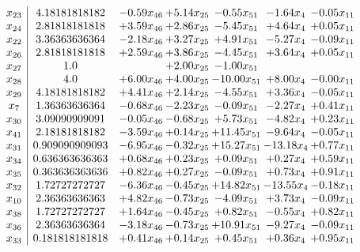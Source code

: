 \documentclass[8pt]{article}
\begin{document}
\[\begin{array}{c| c c@{\hskip 2pt} c@{\hskip 2pt} c@{\hskip 2pt} c@{\hskip 2pt} c@{\hskip 2pt} }
 x_{23}   &  4.18181818182 & -0.59 x_{46} & +  5.14 x_{25} & -0.55 x_{51} & -1.64 x_{4} & -0.05 x_{11}\\
 x_{24}   &  2.81818181818 & +  3.59 x_{46} & +  2.86 x_{25} & -5.45 x_{51} & +  4.64 x_{4} & +  0.05 x_{11}\\
 x_{22}   &  3.36363636364 & -2.18 x_{46} & +  3.27 x_{25} & +  4.91 x_{51} & -5.27 x_{4} & -0.09 x_{11}\\
 x_{26}   &  2.81818181818 & +  2.59 x_{46} & +  3.86 x_{25} & -4.45 x_{51} & +  3.64 x_{4} & +  0.05 x_{11}\\
 x_{27}   &  1.0  &   & +  2.00 x_{25} & -1.00 x_{51} &    &   \\
 x_{28}   &  4.0 & +  6.00 x_{46} & +  4.00 x_{25} & -10.00 x_{51} & +  8.00 x_{4} & -0.00 x_{11}\\
 x_{29}   &  4.18181818182 & +  4.41 x_{46} & +  2.14 x_{25} & -4.55 x_{51} & +  3.36 x_{4} & -0.05 x_{11}\\
 x_{7}   &  1.36363636364 & -0.68 x_{46} & -2.23 x_{25} & -0.09 x_{51} & -2.27 x_{4} & +  0.41 x_{11}\\
 x_{30}   &  3.09090909091 & -0.05 x_{46} & -0.68 x_{25} & +  5.73 x_{51} & -4.82 x_{4} & +  0.23 x_{11}\\
 x_{41}   &  2.18181818182 & -3.59 x_{46} & +  0.14 x_{25} & + 11.45 x_{51} & -9.64 x_{4} & -0.05 x_{11}\\
 x_{31}   &  0.909090909093 & -6.95 x_{46} & -0.32 x_{25} & + 15.27 x_{51} & -13.18 x_{4} & +  0.77 x_{11}\\
 x_{34}   &  0.636363636363 & +  0.68 x_{46} & +  0.23 x_{25} & +  0.09 x_{51} & +  0.27 x_{4} & +  0.59 x_{11}\\
 x_{35}   &  0.363636363636 & +  0.82 x_{46} & +  0.27 x_{25} & -0.09 x_{51} & +  0.73 x_{4} & +  0.91 x_{11}\\
 x_{32}   &  1.72727272727 & -6.36 x_{46} & -0.45 x_{25} & + 14.82 x_{51} & -13.55 x_{4} & -0.18 x_{11}\\
 x_{10}   &  2.36363636363 & +  4.82 x_{46} & -0.73 x_{25} & -4.09 x_{51} & +  3.73 x_{4} & -0.09 x_{11}\\
 x_{38}   &  1.72727272727 & +  1.64 x_{46} & -0.45 x_{25} & +  0.82 x_{51} & -0.55 x_{4} & +  0.82 x_{11}\\
 x_{36}   &  2.36363636364 & -3.18 x_{46} & -0.73 x_{25} & + 10.91 x_{51} & -9.27 x_{4} & -0.09 x_{11}\\
 x_{33}   &  0.181818181818 & +  0.41 x_{46} & +  0.14 x_{25} & +  0.45 x_{51} & +  0.36 x_{4} & +  0.95 x_{11}\\

\end{array}\]
\end{document}
